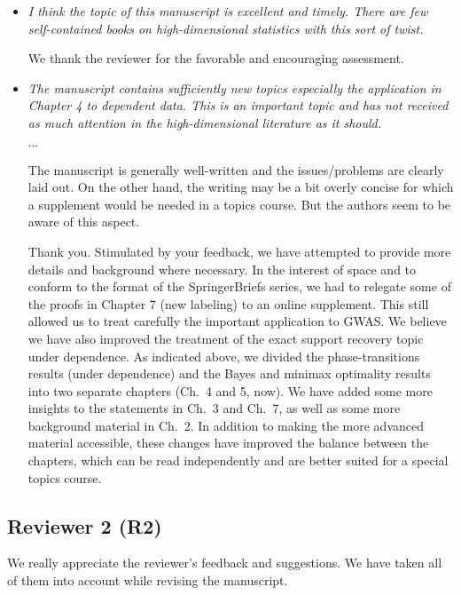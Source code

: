 \documentclass[11pt]{article}
\begin{document}
 \begin{itemize}
  \item {\em I think the topic of this manuscript is excellent and timely. There are few self-contained books on high-dimensional statistics with this sort of twist.}
  
  We thank the reviewer for the favorable and encouraging assessment.  
  
  \item {\em  The manuscript contains sufficiently new topics especially the application in Chapter 4 to dependent data. This is an important topic and has not received as much attention in the high-dimensional literature as it should.
  
  \centerline{$\cdots$}
  
  The manuscript is generally well-written and the issues/problems are clearly laid out. On the other hand, the writing may be a bit overly concise for which a supplement would be needed in a topics course. But the authors seem to be aware of this aspect.}
  
  Thank you.  Stimulated by your feedback, we have attempted to provide more details and background where necessary.  In the interest of space and to 
  conform to the format of the SpringerBriefs series, we had to relegate some of the proofs in Chapter 7 (new labeling) to an online supplement.  This still 
  allowed us to treat carefully the important application to GWAS.  We believe we have also improved the treatment of the exact support recovery topic under 
  dependence.  As indicated above, we divided the phase-transitions results (under dependence) and the Bayes and minimax optimality results into 
  two separate chapters (Ch.\ 4 and 5, now).   We have added some more insights to the statements in Ch.\ 3 and Ch.\ 7, as well as some more 
  background material in Ch.\ 2.  In addition to making the more advanced material accessible, these changes have improved the balance between
  the chapters, which can be read independently and are better suited for a special topics course.
 
  \end{itemize}
  
  \subsection{Reviewer 2 (R2)}
  
  We really appreciate the reviewer's feedback and suggestions.   We have taken all of them into account while revising the manuscript. 
  
\end{document}
